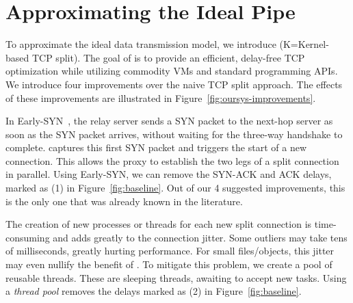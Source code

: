 \section{Approximating the Ideal Pipe}\label{sec:approx}

To approximate the ideal data transmission model, we introduce \textit{\oursys}(K=Kernel-based TCP split).
The goal of \oursys is to provide an efficient, delay-free TCP optimization while utilizing commodity VMs and standard programming APIs. We introduce four improvements over the naive TCP split approach. The effects of these improvements are illustrated in Figure~\ref{fig:oursys-improvements}. 



  In Early-SYN~\cite{ladiwala,siracusano2016miniproxy}, the relay server sends a SYN packet to the next-hop server as soon as the SYN packet arrives, without waiting for the three-way handshake to complete. \oursys captures this first SYN packet and triggers the start of a new connection. This allows the proxy to establish the two legs of a split connection in parallel. Using {Early-SYN}, we can remove the SYN-ACK and ACK delays, marked as (1) in Figure~\ref{fig:baseline}. Out of our 4 suggested improvements, this is the only one that was already known in the literature.

The creation of new processes or threads for each new split connection is time-consuming and adds greatly to the connection jitter. Some outliers may take tens of milliseconds, greatly hurting performance. For small files/objects, this jitter may even nullify the benefit of \oursys. To mitigate this problem, we create a pool of reusable threads. These are sleeping threads, awaiting to accept new tasks. Using a \textit{thread pool} removes the delays marked as (2) in Figure~\ref{fig:baseline}. 

